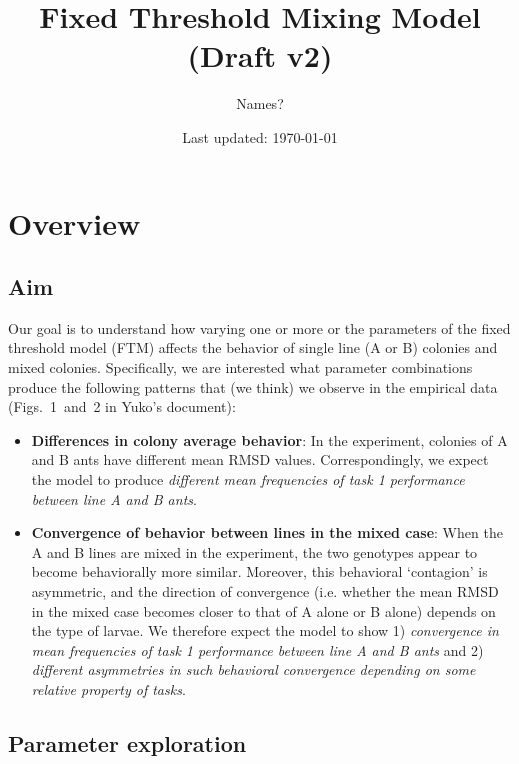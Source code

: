 \documentclass[11pt]{article}
\title{Fixed Threshold Mixing Model ({\color{red}Draft v2})}
\author{Names?}
\date{Last updated: \today}
\begin{document}
\maketitle
\tableofcontents

\newpage
\section{Overview}

\subsection{Aim}\label{sec:aim}
Our goal is to understand how varying one or more or the parameters of the fixed threshold model (FTM) affects the behavior of single line (A or B) colonies and mixed colonies. Specifically, we are interested what parameter combinations produce the following patterns that (we think) we observe in the empirical data (Figs.~1~and~2 in Yuko's document):

\begin{itemize}
    \item \textbf{Differences in colony average behavior}: 
    In the experiment, colonies of A and B ants have different mean RMSD values. Correspondingly, we expect the model to produce \textit{different mean frequencies of task 1 performance between line A and B ants}.

    \item \textbf{Convergence of behavior between lines in the mixed case}:
    When the A and B lines are mixed in the experiment, the two genotypes appear to become behaviorally more similar. Moreover, this behavioral `contagion' is asymmetric, and the direction of convergence (i.e. whether the mean RMSD in the mixed case becomes closer to that of A alone or B alone) depends on the type of larvae. We therefore expect the model to show 1) \textit{convergence in mean frequencies of task 1 performance between line A and B ants} and 2) \textit{different asymmetries in such behavioral convergence depending on some relative property of tasks}.
    
\end{itemize}


\subsection{Parameter exploration}
\end{document}

